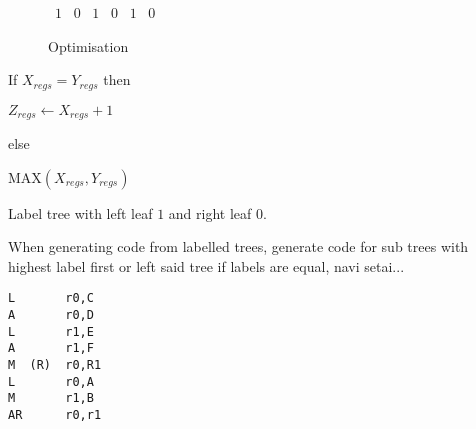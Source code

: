 \documentclass[a4paper,12pt]{article}
\begin{document}
\begin{figure}[ht]

\vspace{15mm}


{
		{
			 ~{$1$}
			 ~{$0$}
		}
		{
			{
				 ~{$1$}	
				 ~{$0$}	
			}
			{
				 ~{$1$}	
				 ~{$0$}	
			}
		}
}

\end{figure}

\begin{figure}[ht]


{
}

\caption{Optimisation}

\end{figure}

If $X_{regs} = Y_{regs}$ then


\hspace{10mm} $Z_{regs} \gets X_{regs} + 1$

else

\hspace{10mm} MAX$(X_{regs}, Y_{regs})$

Label tree with left leaf $1$ and right leaf $0$.


When generating code from labelled trees, generate code for sub trees
with highest label first or left said tree if labels are equal, navi
setai...

\begin{verbatim}
L       r0,C
A       r0,D
L       r1,E
A       r1,F
M  (R)  r0,R1
L       r0,A
M       r1,B
AR      r0,r1
\end{verbatim}
\end{document}
